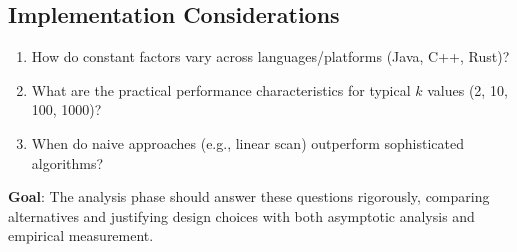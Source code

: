 \documentclass[11pt]{article}
\begin{document}
\subsection{Implementation Considerations}

\begin{enumerate}
    \item How do constant factors vary across languages/platforms (Java, C++, Rust)?
    \item What are the practical performance characteristics for typical $k$ values (2, 10, 100, 1000)?
    \item When do naive approaches (e.g., linear scan) outperform sophisticated algorithms?
\end{enumerate}

\textbf{Goal}: The analysis phase should answer these questions rigorously, comparing alternatives and justifying design choices with both asymptotic analysis and empirical measurement.
\end{document}
